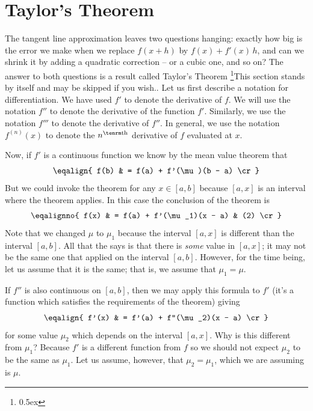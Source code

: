 

\section{Taylor's Theorem}
The tangent line approximation leaves two questions hanging: exactly how big
is the error we make when we replace $f(x+h)$ by $f(x) + f'(x)\,h$, and can
we shrink it by adding a quadratic correction -- or a cubic one, and so on?
The answer to both questions is a result called Taylor's Theorem%
\footnote{\kern 0.5pt \raise 0.5ex \hbox{\dag}}{This section stands by itself and may be skipped if you wish.}.
Let us first
describe a notation for differentiation.
We have used $f'$ to denote the derivative of $f$. We will use the notation $f''$ to denote the 
derivative of the function $f'$. Similarly, we use the notation $f'''$ to denote the derivative 
of $f''$. In general, we use the notation $f^{(n)}(x)$ to denote 
the $n^{\rm th}$ derivative of $f$ evaluated at $x$. 

Now, if $f'$ is a continuous function we know 
by the mean value theorem that
$$
\eqalign{
f(b) & = f(a) + f'(\mu)(b - a) \cr
}
$$
But we could invoke the theorem for any $x \in [a,b]$ because $[a,x]$ is an interval where the 
theorem applies. In this case the conclusion of the theorem is
$$
\eqalignno{
f(x) & = f(a) + f'(\mu_1)(x - a) & (2) \cr
}
$$
Note that we changed $\mu$ to $\mu_1$ because the interval $[a,x]$ is different than the interval $[a,b]$.
All that the  says is that there is {\it some\/} value in $[a,x]$; it may not 
be the same one that applied on the interval $[a,b]$. However, for the time being, let us assume 
that it is the same; that is, we assume that $\mu_1 = \mu$.

If $f''$ is also continuous on $[a,b]$, 
then we may apply this formula to $f'$ (it's a function which satisfies the requirements of the theorem) giving
$$
\eqalign{
f'(x) & = f'(a) + f''(\mu_2)(x - a) \cr
}
$$
for some value $\mu_2$ which depends on the interval $[a,x]$. Why is this different from $\mu_1$?
Because $f'$ is a different function from $f$ so we should not expect $\mu_2$ to be the same as $\mu_1$.
Let us assume, however, that 
$\mu_2 = \mu_1$, which we are assuming is $\mu$.

